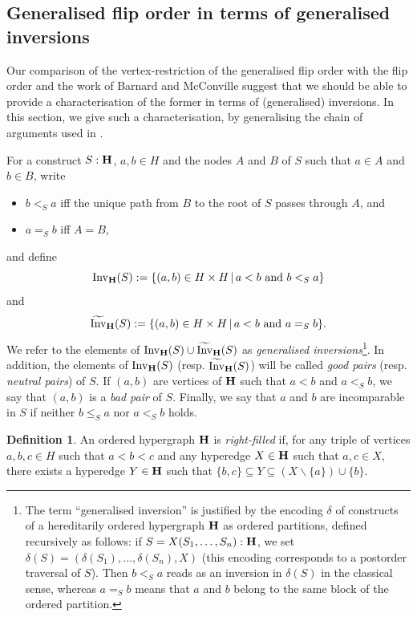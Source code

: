 \documentclass{article}
\theoremstyle{plain}
\theoremstyle{definition}
\newtheorem{definition}[thm]{Definition}
\newcommand{\Invt}{\widetilde{\mathrm{Inv}}}
\newcommand{\Inv}{{\mathrm{Inv}}}
\begin{document}
\subsection{Generalised flip order in terms of generalised inversions} \label{inversion-subsection}
 

Our comparison of the vertex-restriction of the generalised flip order with the flip order and the work of Barnard and McConville suggest that we should be able to provide a characterisation of the former in terms of (generalised) inversions. In this section, we give such a characterisation, by generalising the chain of arguments used in \cite{BM}. 
\smallskip

 For a construct $S:{\bf H}$, $a,b\in H$ and the nodes $A$ and $B$ of $S$ such that $a\in A$ and $b\in B$, write
\begin{itemize}
\item $b<_S a$ iff the unique path from $B$ to the root of $S$ passes through $A$, and
 

\item $a=_S b$ iff $A=B$,
\end{itemize}
and define
$$\Inv_{\bf H}(S):=\{(a,b)\in H\times H\,|\,a<b \mbox{ and } b<_S a\}$$
and $$\Invt_{\bf H}(S):=\{(a,b)\in H\times H\,|\,a<b \mbox{ and } a=_S b\}.$$
We refer to the elements of $\Inv_{\bf H}(S)\cup \Invt_{\bf H}(S)$ as {\em generalised inversions}\footnote{The term ``generalised inversion'' is justified by the encoding $\delta$ of constructs of
a hereditarily ordered hypergraph ${\bf H}$ as ordered partitions, defined recursively as follows: if $S=X(S_1,\dots,S_n):{\bf H}$, 
we set
$\delta(S)=(\delta(S_1),\dots,\delta(S_n),X)$ (this encoding corresponds to a postorder traversal of $S$). Then $b<_S a$ reads as an inversion in $\delta(S)$ in the classical sense, whereas $a=_S b$ means that $a$ and $b$ belong to the same block of the ordered partition.}. In addition, the elements of $\Inv_{\bf H}(S)$ (resp. $\Invt_{\bf H}(S)$) will be called {\em good pairs} (resp. {\em neutral pairs}) of $S$.
 If $(a,b)$ are vertices of ${\bf H}$ such that $a<b$ and $a<_S b$, we say that $(a,b)$ is a {\em bad pair} of $S$. Finally, we say that $a$ and $b$ are incomparable in $S$ if neither $b\leq_S a$ nor $a<_S b$ holds.
\smallskip


 

\begin{definition}

An ordered hypergraph ${\bf H}$ is {\em right-filled} if, for any triple of vertices $a,b,c\in H$ such that $a<b<c$ and any hyperedge $X\in {\bf H}$ such that $a,c\in X$, there exists a hyperedge $Y\in{\bf H}$ such that $\{b,c\}\subseteq Y\subseteq (X\backslash\{a\})\cup\{b\}$. 
\end{definition}
\end{document}
